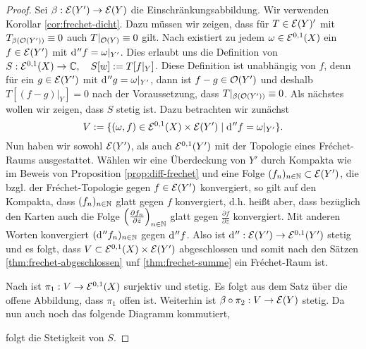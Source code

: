 \begin{proof}
  Sei $\beta: \mathcal{E}(Y') \rightarrow \mathcal{E}(Y)$ die Einschränkungsabbildung. Wir
  verwenden Korollar \ref{cor:frechet-dicht}. Dazu müssen wir zeigen, dass für $T \in
  \mathcal{E}(Y)'$ mit $T_{\beta(\mathcal{O}(Y'))} \equiv 0$ auch $T|_{\mathcal{O}(Y)}
  \equiv 0$ gilt. 
  Nach \cite[Kor. 14.16]{For} existiert zu jedem $\omega \in \mathcal{E}^{0,1}(X)$ ein $f \in
  \mathcal{E}(Y')$ mit $\d[''f] = \omega|_{Y'}$. 
  Dies erlaubt uns die Definition von $S: \mathcal{E}^{0,1}(X) \rightarrow \mathbb{C}, \quad
  S[w] := T[f|_Y]$. Diese Definition ist unabhängig von $f$, denn für
  ein $g \in \mathcal{E}(Y')$ mit $\d[''g] = \omega|_{Y'}$, dann ist $f-g
  \in \mathcal{O}(Y')$ und deshalb $T[(f-g)|_Y] = 0$ nach der Voraussetzung,
  dass $T|_{\beta(\mathcal{O}(Y'))} \equiv 0$. 
  Als nächstes wollen wir zeigen, dass $S$ stetig ist. 
  Dazu betrachten wir zunächst
  \[
  V := \{ (\omega, f) \in \diff^{0,1}(X) \times \diff(Y') \mid \d[''f] = \omega|_{Y'} \}.
  \]
  Nun haben wir
  sowohl $\mathcal{E}(Y')$, als auch $\mathcal{E}^{0,1}(Y')$ mit der Topologie
  eines Fr\'echet-Raums ausgestattet. Wählen wir eine Überdeckung von
  $Y'$ durch Kompakta wie im Beweis von Proposition
  \ref{prop:diff-frechet} und eine Folge $(f_n)_{n\in \mathbb{N}} \subset
  \mathcal{E}(Y')$, die bzgl. der Fr\'echet-Topologie gegen $f \in \mathcal{E}(Y')$
  konvergiert, so gilt auf den Kompakta, dass $(f_n)_{n\in \mathbb{N}}$ glatt
  gegen $f$ konvergiert, d.h. heißt aber, dass bezüglich den Karten
  auch die Folge $\left(\frac{\partial f_n}{\partial \bar z} \right
  )_{n \in\mathbb{N}}$ glatt gegen $\frac{\partial f}{\partial \bar
      z}$ konvergiert. Mit anderen Worten konvergiert
    $(\d[''f_n])_{n\in \N}$ gegen $\d[''f]$. Also ist 
  $\d['']: \diff(Y') \ra \diff^{0,1}(Y')$ stetig und es folgt, dass $V
  \subset \mathcal{E}^{0,1}(X) \times \mathcal{E}(Y')$ abgeschlossen und somit
  nach den Sätzen \ref{thm:frechet-abgeschlossen} unf \ref{thm:frechet-summe} ein
  Fr\'echet-Raum ist.
  
  Nach \cite[Kor. 14.16]{For} ist $\pi_1: V \rightarrow \mathcal{E}^{0,1}(X)$
  surjektiv und stetig. Es folgt aus dem Satz über die offene
  Abbildung, dass $\pi_1$ offen ist.
  Weiterhin ist $\beta \circ \pi_2 : V \rightarrow \mathcal{E}(Y)$ stetig. Da nun
  auch noch das folgende Diagramm kommutiert,
  \begin{center}
  \end{center}
  folgt die Stetigkeit von $S$.


\end{proof}
